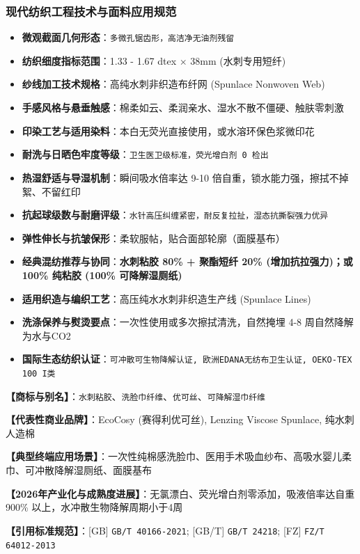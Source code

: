 \documentclass[11pt,openright,twoside,UTF8]{ctexbook}
\begin{document}
\subsubsection*{现代纺织工程技术与面料应用规范}
\begin{itemize} \setlength{\itemsep}{2pt}
    \item \textbf{微观截面几何形态}：\texttt{多微孔锯齿形，高洁净无油剂残留}
    \item \textbf{纺织细度指标范围}：1.33 - 1.67 dtex $\times$ 38mm (水刺专用短纤)
    \item \textbf{纱线加工技术规格}：高纯水刺非织造布纤网 (Spunlace Nonwoven Web)
    \item \textbf{手感风格与悬垂触感}：棉柔如云、柔润亲水、湿水不散不僵硬、触肤零刺激
    \item \textbf{印染工艺与适用染料}：本白无荧光直接使用，或水溶环保色浆微印花
    \item \textbf{耐洗与日晒色牢度等级}：\texttt{卫生医卫级标准，荧光增白剂 0 检出}
    \item \textbf{热湿舒适与导湿机制}：瞬间吸水倍率达 9-10 倍自重，锁水能力强，擦拭不掉絮、不留红印
    \item \textbf{抗起球级数与耐磨评级}：\texttt{水针高压纠缠紧密，耐反复拉扯，湿态抗撕裂强力优异}
    \item \textbf{弹性伸长与抗皱保形}：柔软服帖，贴合面部轮廓（面膜基布）
    \item \textbf{经典混纺推荐与协同}：\textbf{水刺粘胶 80\% + 聚酯短纤 20\% (增加抗拉强力)；或 100\% 纯粘胶 (100\% 可降解湿厕纸)}
    \item \textbf{适用织造与编织工艺}：高压纯水水刺非织造生产线 (Spunlace Lines)
    \item \textbf{洗涤保养与熨烫要点}：一次性使用或多次擦拭清洗，自然掩埋 4-8 周自然降解为水与CO2
    \item \textbf{国际生态纺织认证}：\texttt{可冲散可生物降解认证, 欧洲EDANA无纺布卫生认证, OEKO-TEX 100 I类}
\end{itemize}
\vspace{0.2cm}

\noindent\textbf{【商标与别名】}：\texttt{水刺粘胶}、\texttt{洗脸巾纤维}、\texttt{优可丝}、\texttt{可降解湿巾纤维}\par
\noindent\textbf{【代表性商业品牌】}：EcoCosy (赛得利优可丝), Lenzing Viscose Spunlace, 纯水刺人造棉\par
\noindent\textbf{【典型终端应用场景】}：一次性纯棉感洗脸巾、医用手术吸血纱布、高吸水婴儿柔巾、可冲散降解湿厕纸、面膜基布\par
\noindent\textbf{【2026年产业化与成熟度进展】}：无氯漂白、荧光增白剂零添加，吸液倍率达自重 900\% 以上，水冲散生物降解周期小于4周\par
\noindent\textbf{【引用标准规范】}：[GB] \texttt{GB/T 40166-2021}; [GB/T] \texttt{GB/T 24218}; [FZ] \texttt{FZ/T 64012-2013}\par
\vspace{0.5cm}
\end{document}
